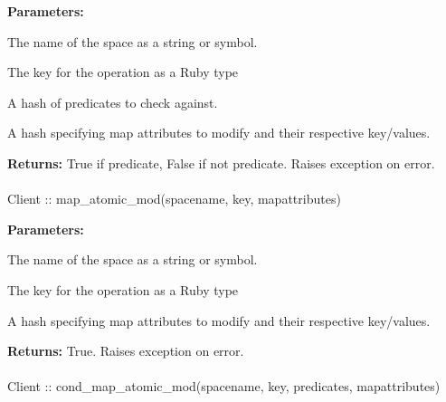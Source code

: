 \noindent\textbf{Parameters:}
\begin{description}[labelindent=\widthof{{\code{mapattributes}}},leftmargin=*,noitemsep,nolistsep,align=right]
\item[\code{spacename}] The name of the space as a string or symbol.
\item[\code{key}] The key for the operation as a Ruby type
\item[\code{predicates}] A hash of predicates to check against.
\item[\code{mapattributes}] A hash specifying map attributes to modify and their respective key/values.
\end{description}

\noindent\textbf{Returns:}
True if predicate, False if not predicate.  Raises exception on error.

\paragraph{}
\label{api:ruby:map_atomic_mod}
\begin{rubycode}
Client :: map_atomic_mod(spacename, key, mapattributes)
\end{rubycode}


\noindent\textbf{Parameters:}
\begin{description}[labelindent=\widthof{{\code{mapattributes}}},leftmargin=*,noitemsep,nolistsep,align=right]
\item[\code{spacename}] The name of the space as a string or symbol.
\item[\code{key}] The key for the operation as a Ruby type
\item[\code{mapattributes}] A hash specifying map attributes to modify and their respective key/values.
\end{description}

\noindent\textbf{Returns:}
True.  Raises exception on error.

\paragraph{}
\label{api:ruby:cond_map_atomic_mod}
\begin{rubycode}
Client :: cond_map_atomic_mod(spacename, key, predicates, mapattributes)
\end{rubycode}


